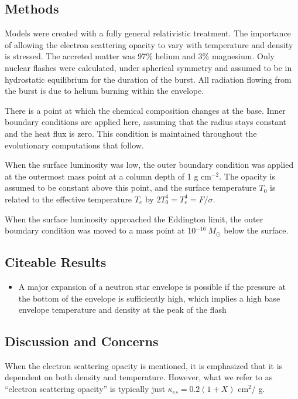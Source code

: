 \documentclass[onecolumn]{aastex63}
\begin{document}
\subsection{Methods}
Models were created with a fully general relativistic treatment. The importance of allowing the electron scattering opacity to vary with temperature and density is stressed. The accreted matter was 97\% helium and 3\% magnesium. Only nuclear flashes were calculated, under spherical symmetry and assumed to be in hydrostatic equilibrium for the duration of the burst. All radiation flowing from the burst is due to helium burning within the envelope.

There is a point at which the chemical composition changes at the base. Inner boundary conditions are applied here, assuming that the radius stays constant and the heat flux is zero. This condition is maintained throughout the evolutionary computations that follow. 

When the surface luminosity was low, the outer boundary condition was applied at the outermost mass point at a column depth of 1 g cm$^{-2}$. The opacity is assumed to be constant above this point, and the surface temperature $T_0$ is related to the effective temperature $T_e$ by $2T_0^4 = T_e^4 = F/\sigma$. 

When the surface luminosity approached the Eddington limit, the outer boundary condition was moved to a mass point at 10$^{-16}\ M_\odot$ below the surface. 

\subsection{Citeable Results}
\begin{itemize}
    \item A major expansion of a neutron star envelope is possible if the pressure at the bottom of the envelope is sufficiently high, which implies a high base envelope temperature and density at the peak of the flash
\end{itemize}

\subsection{Discussion and Concerns}
When the electron scattering opacity is mentioned, it is emphasized that it is dependent on both density and temperature. However, what we refer to as ``electron scattering opacity'' is typically just $\kappa_{es} = 0.2(1 + X)$ cm$^2$/ g.
\end{document}
